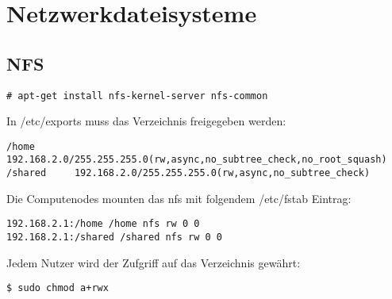 \chapter{Netzwerkdateisysteme}
\section{NFS}
\begin{lstlisting}[style=Bash]
# apt-get install nfs-kernel-server nfs-common
\end{lstlisting}
In /etc/exports muss das Verzeichnis freigegeben werden:
\begin{lstlisting}[style=Bash]
/home       192.168.2.0/255.255.255.0(rw,async,no_subtree_check,no_root_squash)
/shared     192.168.2.0/255.255.255.0(rw,async,no_subtree_check)
\end{lstlisting}
Die Computenodes mounten das nfs mit folgendem /etc/fstab Eintrag:
\begin{lstlisting}[style=Bash]
192.168.2.1:/home /home nfs rw 0 0
192.168.2.1:/shared /shared nfs rw 0 0
\end{lstlisting}
Jedem Nutzer wird der Zufgriff auf das Verzeichnis gewährt:
\begin{lstlisting}[style=Bash]
$ sudo chmod a+rwx
\end{lstlisting}
